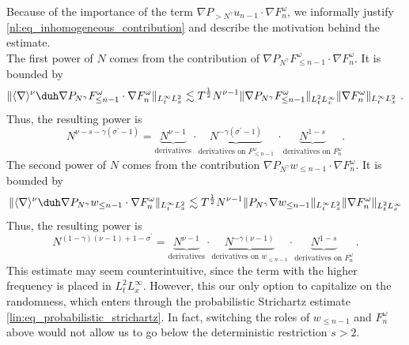 \documentclass[11pt]{article}
\begin{document}
\begin{rem}
Because of the importance of the term \( \nabla P_{>N^\gamma} u_{n-1} \cdot \nabla F_n^\omega \), we  informally justify \eqref{nl:eq_inhomogeneous_contribution} and describe the motivation behind the estimate. \\
The first power of \( N \) comes from the contribution of \( \nabla P_{N^\gamma} F_{\leq n-1}^\omega \cdot \nabla F_{n}^\omega \). It is bounded by
\begin{equation*}
\| \langle  \nabla \rangle^{\nu} \duh \nabla P_{N^\gamma} F_{\leq n-1}^\omega \cdot \nabla F_n^\omega \|_{L_t^\infty L_x^2} \lesssim
T^{\frac{1}{2}} N^{\nu-1} \| \nabla P_{N^\gamma} F_{\leq n-1}^\omega \|_{L_t^2L_x^\infty}  \| \nabla F_n^\omega \|_{L_t^\infty L_x^2}~. 
\end{equation*}
Thus, the resulting power is 
\begin{equation}\label{lin:cond_rough_rough}
N^{\nu-s-\gamma(\sigma^\prime-1)} = \underbrace{N^{\nu-1}}_{\text{derivatives}}  \cdot \underbrace{N^{-\gamma(\sigma^\prime-1)}}_{\text{derivatives on }F_{\leq n-1}^\omega} ~\cdot \underbrace{N^{1-s}}_{\text{derivatives on }F_n^\omega}.
\end{equation}
The second power of \( N \) comes from the contribution  \( \nabla P_{N^\gamma} w_{\leq n-1} \cdot \nabla F_n^\omega \). It is bounded by 
\begin{equation*}
\| \langle  \nabla \rangle^{\nu} \duh \nabla P_{N^\gamma} w_{\leq n-1} \cdot \nabla F_n^\omega \|_{L_t^\infty L_x^2}\lesssim T^{\frac{1}{2}} N^{\nu-1} \| P_{N^\gamma} \nabla w_{\leq n-1} \|_{L_t^\infty L_x^2}   \| \nabla F_n^\omega \|_{L_t^2 L_x^\infty}
\end{equation*}
Thus, the resulting power is
\begin{equation}\label{lin:cond_smooth_rough}
N^{(1-\gamma) (\nu-1)+1-\sigma^\prime}= \underbrace{N^{\nu-1}}_{\text{derivatives}}  \cdot \underbrace{N^{-\gamma(\nu-1)}}_{\text{derivatives on }w_{\leq n-1}}\cdot \underbrace{N^{1-s}}_{\text{derivatives on }F_n^\omega}~.
\end{equation}
This estimate may seem counterintuitive, since the term with the higher frequency is placed in \( L_t^2 L_x^\infty \). However, this our only option to capitalize on the randomness, which enters through the probabilistic Strichartz estimate \eqref{lin:eq_probabilistic_strichartz}. In fact, switching the roles of \( w_{\leq n-1} \) and \( F_n^\omega \) above would not allow us to go below the deterministic restriction \( s>2 \). \\
\end{rem}
\end{document}
